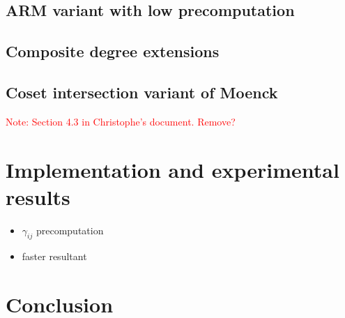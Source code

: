 \documentclass{article}
\newcommand{\Notes}[1]{\textcolor{red}{Note: #1}}
\begin{document}
\subsection{ARM variant with low precomputation}
\label{sec:low-precomputation}


\subsection{Composite degree extensions}
\label{sec:composite-degree}


\subsection{Coset intersection variant of Moenck}
\label{sec:SRAMoenck}
\Notes{Section 4.3 in Christophe's document. Remove?}



\section{Implementation and experimental results}
\label{sec:impl-exper-results}

\begin{itemize}
\item $\gamma_{ij}$ precomputation
\item faster resultant
\end{itemize}

\section{Conclusion}
\label{sec:conclusion}





\end{document}

